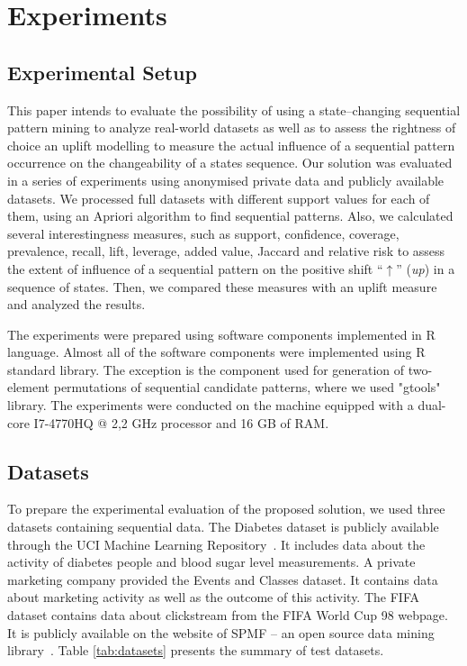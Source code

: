 \documentclass[runningheads,a4paper]{llncs}
\begin{document}
\section{Experiments}
\label{sec:experiments}
\subsection{Experimental Setup}
This paper intends to evaluate the possibility of using a state--changing sequential pattern mining to analyze real-world datasets as well as to assess the rightness of choice an uplift modelling to measure the actual influence of a sequential pattern occurrence on the changeability of a states sequence. Our solution was evaluated in a series of experiments using anonymised private data and publicly available datasets. We processed full datasets with different support values for each of them, using an Apriori algorithm to find sequential patterns. Also, we calculated several interestingness measures, such as support, confidence, coverage, prevalence, recall, lift, leverage, added value, Jaccard and relative risk to assess the extent of influence of a sequential pattern on the positive shift ``$\uparrow$'' (\textit{up}) in a sequence of states. Then, we compared these measures with an uplift measure and analyzed the results. 

The experiments were prepared using software components implemented in R language. Almost all of the software components were implemented using R standard library. The exception is the component used for generation of two-element permutations of sequential candidate patterns, where we used "gtools" library. The experiments were conducted on the machine equipped with a dual-core I7-4770HQ @ 2,2 GHz processor and 16 GB of RAM.

\subsection{Datasets}
To prepare the experimental evaluation of the proposed solution, we used three datasets containing sequential data. The Diabetes dataset is publicly available through the UCI Machine Learning Repository~\cite{Kahn:1994}. It includes data about the activity of diabetes people and blood sugar level measurements. A private marketing company provided the Events and Classes dataset. It contains data about marketing activity as well as the outcome of this activity. The FIFA dataset contains data about clickstream from the FIFA World Cup 98 webpage. It is publicly available on the website of SPMF – an open source data mining library~\cite{Fournier}. Table \ref{tab:datasets} presents the summary of test datasets.
\end{document}
